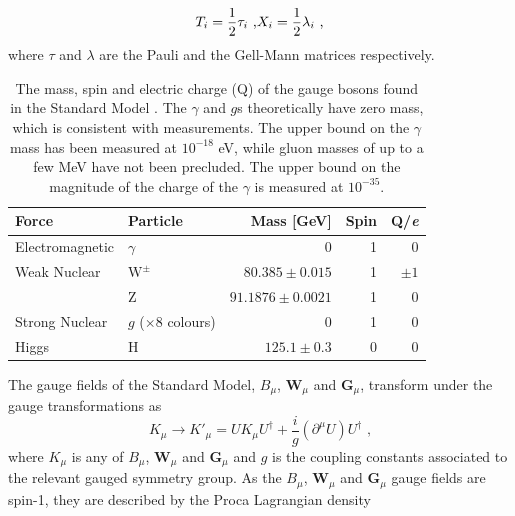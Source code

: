 %
\begin{equation}
T_{i} = \frac{1}{2}\tau_{i} \text{ ,} \\
X_{i} = \frac{1}{2}\lambda_{i} \text{ ,} \\
\end{equation}
%
\noindent where $\tau$ and $\lambda$ are the Pauli and the Gell-Mann matrices respectively.  
%
\begin{table}[h!]
\centering
\begin{tabular}{l l r r r}
\hline
Force & Particle & Mass [GeV] & Spin & Q/\textit{e} \\
\hline
Electromagnetic & $\gamma$ & 0 & 1 & 0 \\
\hline
Weak Nuclear & $\text{W}^{\pm}$ & $80.385 \pm 0.015$ & 1 & $\pm1$ \\
& Z & $91.1876 \pm 0.0021$ & 1 & 0 \\
\hline
Strong Nuclear & $g$ ($\times 8$ colours) & 0 & 1 & 0 \\
\hline
Higgs & H & $125.1 \pm 0.3$ & 0 & 0 \\
\end{tabular}
\caption[The mass, spin and electric charge (Q) of the gauge bosons found in the Standard Model \cite{Beringer:1900zz}.  The $\gamma$ and $g$s theoretically have zero mass, which is consistent with measurements.  The upper bound on the $\gamma$ mass has been measured at $10^{-18}$ eV, while gluon masses of up to a few MeV have not been precluded.  The upper bound on the magnitude of the charge of the $\gamma$ is measured at $10^{-35}$.]{The mass, spin and electric charge (Q) of the gauge bosons found in the Standard Model \cite{Beringer:1900zz}.  The $\gamma$ and $g$s theoretically have zero mass, which is consistent with measurements.  The upper bound on the $\gamma$ mass has been measured at $10^{-18}$ eV, while gluon masses of up to a few MeV have not been precluded.  The upper bound on the magnitude of the charge of the $\gamma$ is measured at $10^{-35}$.}
\label{table:smbosons}
\end{table}
%
The gauge fields of the Standard Model, $B_{\mu}$, $\textbf{W}_{\mu}$ and $\textbf{G}_{\mu}$, transform under the gauge transformations as
%
\begin{equation}
K_{\mu} \rightarrow K'_{\mu} = UK_{\mu}U^{\dagger} + \frac{i}{g}(\partial^{\mu}U)U^{\dagger} \text{ ,} 
\end{equation}
%
\noindent where $K_{\mu}$ is any of $B_{\mu}$, $\textbf{W}_{\mu}$ and $\textbf{G}_{\mu}$ and $g$ is the coupling constants associated to the relevant gauged symmetry group.  As the $B_{\mu}$, $\textbf{W}_{\mu}$ and $\textbf{G}_{\mu}$ gauge fields are spin-1, they are described by the Proca Lagrangian density
